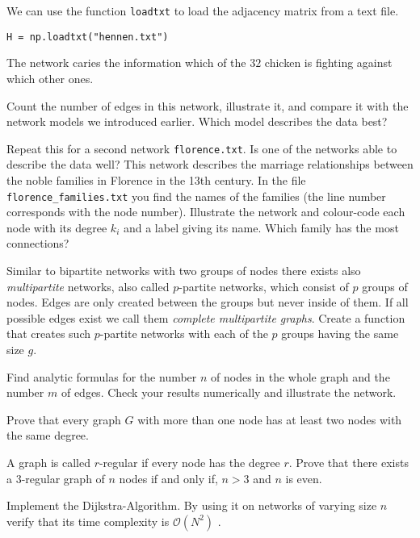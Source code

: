 We can use the function {\tt loadtxt} to load the adjacency matrix from a text file.

\begin{lstlisting}
H = np.loadtxt("hennen.txt")
\end{lstlisting}

The network caries the information which of the $32$ chicken is fighting against which other ones.

Count the number of edges in this network, illustrate it, and compare it with the network models we introduced earlier. Which model describes the data best?


Repeat this for a second network {\tt florence.txt}. Is one of the networks able to describe the data well? This network describes the marriage relationships between the noble families in Florence in the 13th century. In the file {\tt florence\_families.txt}  you find the names of the families (the line number corresponds with the node number). Illustrate the network and colour-code each node with its degree $k_i$ and a label giving its name. Which family has the most connections?



\exercise[%
  topic=Optional Tasks
    ]

\subexercise[%
  topic=Multipartite Networks,
    ]

Similar to bipartite networks with two groups of nodes there exists also \emph{multipartite} networks, also called $p$-partite networks, which consist of $p$ groups of nodes. Edges are only created between the groups but never inside of them. If all possible edges exist we call them \emph{complete multipartite graphs}. Create a function that creates such $p$-partite networks with each of the $p$ groups having the same size $g$.

Find analytic formulas for the number $n$ of nodes in the whole graph and the number $m$ of edges. Check your results numerically and illustrate the network.
		
		\subexercise[%
  topic=Nodes with the same Degree,
    ]
    
    Prove that every graph $G$ with more than one node has at least two nodes with the same degree.
    
 
\subexercise[%
  topic=$3$-regular graphs,
    ]
    
    A graph is called $r$-regular if every node has the degree $r$. Prove that there exists a $3$-regular graph of $n$ nodes if and only if, $n>3$ and $n$ is even.
    		
		
		\subexercise[%
  topic=Dijkstra-Algorithm,
    ]
	
	Implement the Dijkstra-Algorithm. By using it on networks of varying size $n$ verify that its time complexity is $\mathcal{O}(N^2)$ .
	

		


